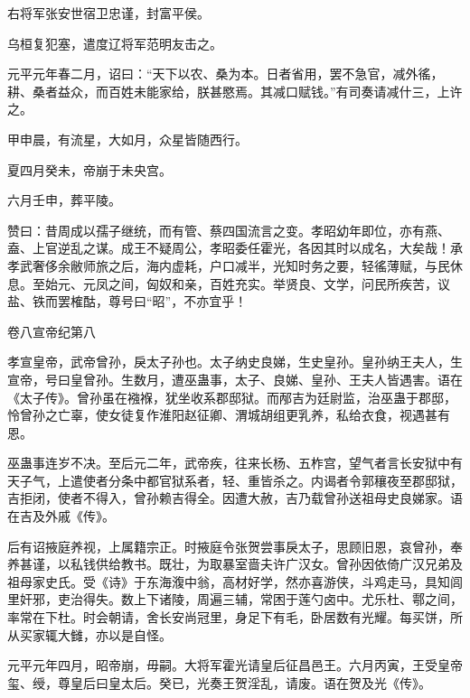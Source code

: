 \documentclass[12pt,UTF8]{ctexbook}
\begin{document}
右将军张安世宿卫忠谨，封富平侯。



乌桓复犯塞，遣度辽将军范明友击之。



元平元年春二月，诏曰：“天下以农、桑为本。日者省用，罢不急官，减外徭，耕、桑者益众，而百姓未能家给，朕甚愍焉。其减口赋钱。”有司奏请减什三，上许之。



甲申晨，有流星，大如月，众星皆随西行。



夏四月癸未，帝崩于未央宫。



六月壬申，葬平陵。



赞曰：昔周成以孺子继统，而有管、蔡四国流言之变。孝昭幼年即位，亦有燕、盍、上官逆乱之谋。成王不疑周公，孝昭委任霍光，各因其时以成名，大矣哉！承孝武奢侈余敝师旅之后，海内虚耗，户口减半，光知时务之要，轻徭薄赋，与民休息。至始元、元凤之间，匈奴和亲，百姓充实。举贤良、文学，问民所疾苦，议盐、铁而罢榷酤，尊号曰“昭”，不亦宜乎！





卷八宣帝纪第八



孝宣皇帝，武帝曾孙，戾太子孙也。太子纳史良娣，生史皇孙。皇孙纳王夫人，生宣帝，号曰皇曾孙。生数月，遭巫蛊事，太子、良娣、皇孙、王夫人皆遇害。语在《太子传》。曾孙虽在襁褓，犹坐收系郡邸狱。而邴吉为廷尉监，治巫蛊于郡邸，怜曾孙之亡辜，使女徒复作淮阳赵征卿、渭城胡组更乳养，私给衣食，视遇甚有恩。



巫蛊事连岁不决。至后元二年，武帝疾，往来长杨、五柞宫，望气者言长安狱中有天子气，上遣使者分条中都官狱系者，轻、重皆杀之。内谒者令郭穰夜至郡邸狱，吉拒闭，使者不得入，曾孙赖吉得全。因遭大赦，吉乃载曾孙送祖母史良娣家。语在吉及外戚《传》。



后有诏掖庭养视，上属籍宗正。时掖庭令张贺尝事戾太子，思顾旧恩，哀曾孙，奉养甚谨，以私钱供给教书。既壮，为取暴室啬夫许广汉女。曾孙因依倚广汉兄弟及祖母家史氏。受《诗》于东海澓中翁，高材好学，然亦喜游侠，斗鸡走马，具知闾里奸邪，吏治得失。数上下诸陵，周遍三辅，常困于莲勺卤中。尤乐杜、鄠之间，率常在下杜。时会朝请，舍长安尚冠里，身足下有毛，卧居数有光耀。每买饼，所从买家辄大雠，亦以是自怪。



元平元年四月，昭帝崩，毋嗣。大将军霍光请皇后征昌邑王。六月丙寅，王受皇帝玺、绶，尊皇后曰皇太后。癸已，光奏王贺淫乱，请废。语在贺及光《传》。
\end{document}
